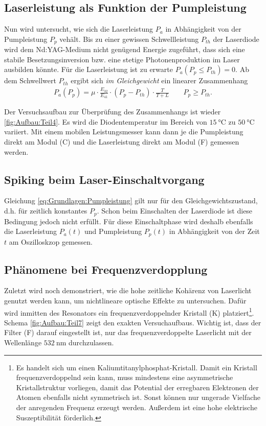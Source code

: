 \documentclass[../main.tex]{subfiles}
\begin{document}
    \subsection{Laserleistung als Funktion der Pumpleistung}
        Nun wird untersucht, wie sich die Laserleistung $P_a$ in Abhängigkeit von der Pumpleistung $P_p$ vehält. Bis zu einer gewissen Schwellleistung $P_{th}$ der Laserdiode wird dem Nd:YAG-Medium nicht genügend Energie zugeführt, dass sich eine stabile Besetzungsinversion bzw. eine stetige Photonenproduktion im Laser ausbilden könnte. Für die Laserleistung ist zu erwarte $P_a(P_p\le P_{th}) = 0$. Ab dem Schwellwert $P_{th}$ ergibt sich \textit{im Gleichgewicht} ein linearer Zusammenhang
        \begin{align}
            P_a(P_p) = \mu\cdot \frac{E_{32}}{E_{41}}\cdot (P_p - P_{th})\cdot\frac{T}{T + L}\qquad P_p\ge P_{th}.    
            \label{eq:Grundlagen:Pumpleistung}
        \end{align}

        Der Versuchsaufbau zur Überprüfung des Zusammenhangs ist wieder \ref{fig:Aufbau:Teil4}. Es wird die Diodentemperatur im Bereich von $\SI{15}{\celsius}$ zu $\SI{50}{\celsius}$ variiert. Mit einem mobilen Leistungsmesser kann dann je die Pumpleistung direkt am Modul (C) und die Laserleistung direkt am Modul (F) gemessen werden.

    \subsection{Spiking beim Laser-Einschaltvorgang}
        Gleichung \ref{eq:Grundlagen:Pumpleistung} gilt nur für den Gleichgewichtszustand, d.h. für zeitlich konstantes $P_p$. Schon beim Einschalten der Laserdiode ist diese Bedingung jedoch nicht erfüllt. Für diese Einschaltphase wird deshalb ebenfalls die Laserleistung $P_a(t)$ und Pumpleistung $P_p(t)$ in Abhängigkeit von der Zeit $t$ am Oszilloskzop gemessen. 

    \subsection{Phänomene bei Frequenzverdopplung}
        Zuletzt wird noch demonstriert, wie die hohe zeitliche Kohärenz von Laserlicht genutzt werden kann, um nichtlineare optische Effekte zu untersuchen. Dafür wird inmitten des Resonators ein frequenzverdoppelnder Kristall (K) platziert\footnote{Es handelt sich um einen Kaliumtitanylphosphat-Kristall. Damit ein Kristall frequenzverdoppelnd sein kann, muss mindestens eine asymmetrische Kristallstruktur vorliegen,  damit das Potential der erregbaren Elektronen der Atomen ebenfalls nicht symmetrisch ist. Sonst können nur ungerade Vielfache der anregenden Frequenz erzeugt werden. Außerdem ist eine hohe elektrische Suszeptibilität förderlich.}. Schema \ref{fig:Aufbau:Teil7} zeigt den exakten Versuchaufbaus. Wichtig ist, dass der Filter (F) darauf eingestellt ist, nur das frequenzverdoppelte Laserlicht mit der Wellenlänge $\SI{532}{\nano\m}$ durchzulassen. 
\end{document}
